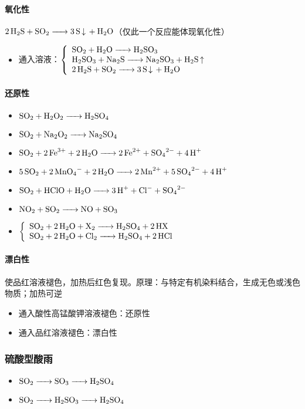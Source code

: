 \paragraph{氧化性}
$\ce{2H2S + SO2 -> 3S v + H2O}$（仅此一个反应能体现氧化性）
\begin{itemize}
	\item {}通入溶液：$\left\{\begin{array}{lr}
			\ce{SO2 + H2O -> H2SO3}\\
			\ce{H2SO3 + Na2S -> Na2SO3 + H2S ^}\\
			\ce{2H2S + SO2 -> 3S v + H2O}\\
		\end{array}\right.$
\end{itemize}
\paragraph{还原性}
\begin{itemize}
	\item $\ce{SO2 + H2O2 -> H2SO4}$
	\item $\ce{SO2 + Na2O2 -> Na2SO4}$
	\item $\ce{SO2 + 2Fe^3+ + 2H2O -> 2Fe^2+ + SO4^2- + 4H+}$
	\item $\ce{5SO2 + 2MnO4- + 2H2O -> 2Mn^2+ + 5SO4^2- + 4H+}$
	\item $\ce{SO2 + HClO + H2O -> 3H+ + Cl- + SO4^2-}$
	\item $\ce{NO2 + SO2 -> NO + SO3}$
	\item $\left\{\begin{array}{lr}
			\ce{SO2 + 2H2O + X2 -> H2SO4 + 2HX}\\
			\ce{SO2 + 2H2O + Cl2 -> H2SO4 + 2HCl}\\
		\end{array}\right.$
\end{itemize}
\paragraph{漂白性}
使\textcolor[rgb]{0.721,0.207,0.105}{品红溶液}褪色，加热后红色复现。原理：与特定有机染料结合，生成无色或浅色物质；加热可逆
\begin{itemize}
	\item {}通入酸性高锰酸钾溶液褪色：还原性
	\item {}通入品红溶液褪色：漂白性
\end{itemize}
\subsubsection{硫酸型酸雨}
\begin{itemize}
	\item $\ce{SO2 -> SO3 -> H2SO4}$
	\item $\ce{SO2 -> H2SO3 -> H2SO4}$
\end{itemize}
